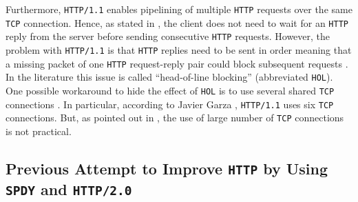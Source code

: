 \documentclass[12pt,a4paper,twoside,openright]{report}
\begin{document}
Furthermore, \texttt{HTTP/1.1} enables pipelining of multiple \texttt{HTTP} requests over the same \texttt{TCP} connection.
Hence, as stated in \cite{bib_digital_ocean_http11_vs_http2}, the client does not need to wait for an \texttt{HTTP} reply from the server before sending consecutive \texttt{HTTP} requests.
However, the problem with \texttt{HTTP/1.1} is that \texttt{HTTP} replies need to be sent in order \cite{RFC7540} meaning that a missing packet of one \texttt{HTTP} request-reply pair could block subsequent requests \cite{bib_digital_ocean_http11_vs_http2}.
In the literature this issue is called \enquote{head-of-line blocking} (abbreviated \texttt{HOL}).
One possible workaround to hide the effect of \texttt{HOL} is to use several shared \texttt{TCP} connections \cite{bib_digital_ocean_http11_vs_http2}.
In particular, according to Javier Garza \cite{bib_will-http2-make-my-site-faster}, \texttt{HTTP/1.1} uses six \texttt{TCP} connections.
But, as pointed out in \cite{bib_digital_ocean_http11_vs_http2}, the use of large number of \texttt{TCP} connections is not practical.



\subsection{Previous Attempt to Improve \texttt{HTTP} by Using \texttt{SPDY} and \texttt{HTTP/2.0}}
\end{document}
